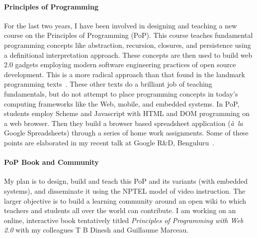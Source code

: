 \documentclass[
9pt, 
]{article}
\begin{document}
\paragraph{Principles of Programming}
For the last two years, I have been involved in designing
and teaching a new course on the Principles of Programming
(PoP).  This course teaches fundamental programming concepts
like abstraction, recursion, closures, and persistence using
a definitional interpretation approach.  These concepts are
then used to build web 2.0 gadgets employing modern software
engineering practices of open source development.  This is a
more radical approach than that found in the landmark
programming texts~\cite{sicp,htdp,eopl}.  These other texts
do a brilliant job of teaching fundamentals, but do not
attempt to place programming concepts in today's computing
frameworks like the Web, mobile, and embedded systems.  In
PoP, students employ Scheme and Javascript with HTML and DOM
programming on a web browser.  Then they build a browser
based spreadsheet application ({\em \`a~la\/} Google
Spreadsheets) through a series of home work assignments.
Some of these points are elaborated in my recent talk at
Google R\&D, Benguluru~\cite{venk-google-talk-2008}.

\paragraph{PoP Book and Community}
My plan is to design, build and teach this PoP and its
variants (with embedded systems), and disseminate it using
the NPTEL model of video instruction.  The larger objective
is to build a learning community around an open wiki to
which teachers and students all over the world can
contribute.  I am working on an online, interactive book
tentatively titled {\em Principles of Programming with Web
  2.0\/} with my colleagues T B Dinesh and Guillaume
Marceau.

\end{document}
